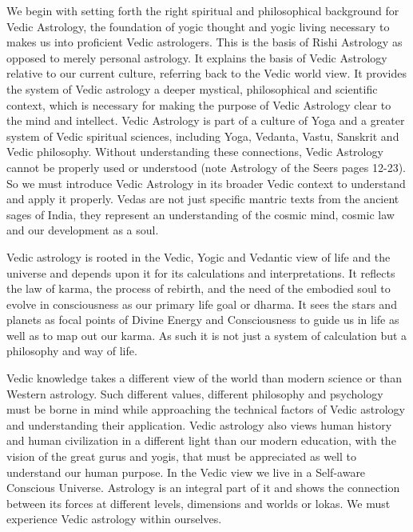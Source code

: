 We begin with setting forth the right spiritual and philosophical background for Vedic Astrology, the foundation of yogic thought and yogic living necessary to makes us into proficient Vedic astrologers. This is the basis of Rishi Astrology as opposed to merely personal astrology. It explains the basis of Vedic Astrology relative to our current culture, referring back to the Vedic world view. It provides the system of Vedic astrology a deeper mystical, philosophical and scientific context, which is necessary for making the purpose of Vedic Astrology clear to the mind and intellect. Vedic Astrology is part of a culture of Yoga and a greater system of Vedic spiritual sciences, including Yoga, Vedanta, Vastu, Sanskrit and Vedic philosophy. Without understanding these connections, Vedic Astrology cannot be properly used or understood (note Astrology of the Seers pages 12-23). So we must introduce Vedic Astrology in its broader Vedic context to understand and apply it properly. Vedas are not just specific mantric texts from the ancient sages of India, they represent an understanding of the cosmic mind, cosmic law and our development as a soul.

 

Vedic astrology is rooted in the Vedic, Yogic and Vedantic view of life and the universe and depends upon it for its calculations and interpretations. It reflects the law of karma, the process of rebirth, and the need of the embodied soul to evolve in consciousness as our primary life goal or dharma. It sees the stars and planets as focal points of Divine Energy and Consciousness to guide us in life as well as to map out our karma. As such it is not just a system of calculation but a philosophy and way of life.

 

Vedic knowledge takes a different view of the world than modern science or than Western astrology. Such different values, different philosophy and psychology must be borne in mind while approaching the technical factors of Vedic astrology and understanding their application.  Vedic astrology also views human history and human civilization in a different light than our modern education, with the vision of the great gurus and yogis, that must be appreciated as well to understand our human purpose. In the Vedic view we live in a Self-aware Conscious Universe. Astrology is an integral part of it and shows the connection between its forces at different levels, dimensions and worlds or lokas. We must experience Vedic astrology within ourselves.

